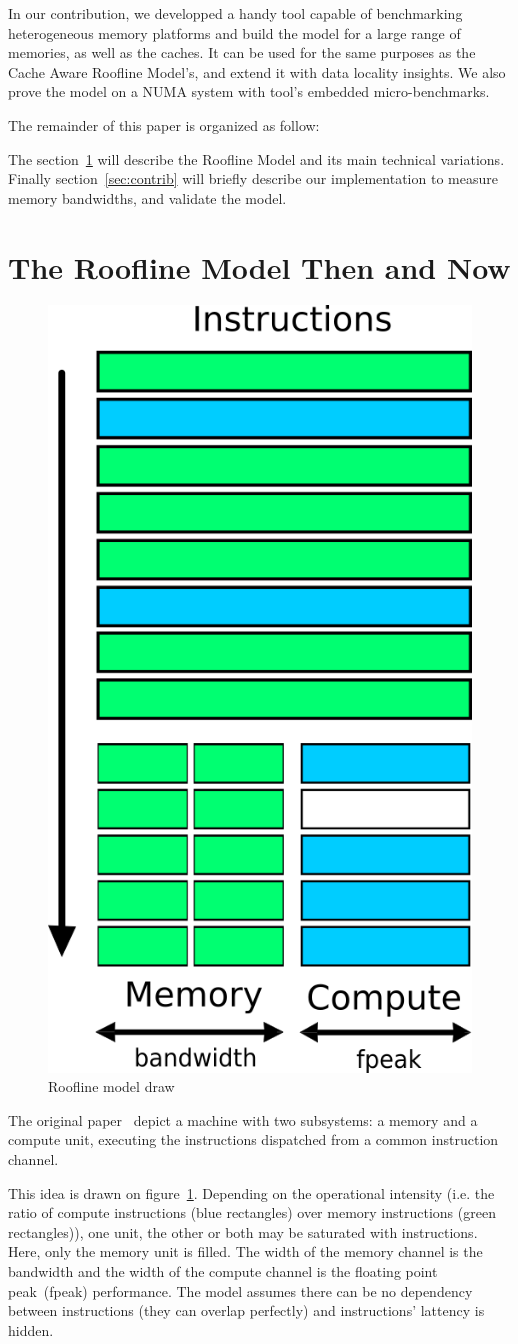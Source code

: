 \documentclass[twoside,twocolumn,8pt]{extarticle}
\begin{document}
In our contribution, we developped a handy tool capable of benchmarking heterogeneous memory platforms and build the model for a
large range of memories, as well as the caches.
It can be used for the same purposes as the Cache Aware Roofline Model's, and extend it with data locality insights.
We also prove the model on a NUMA system with tool's embedded micro-benchmarks.

The remainder of this paper is organized as follow:

The section~\ref{sec:state_of_art} will describe the Roofline Model and its main technical variations.
Finally section~\ref{sec:contrib} will briefly describe our implementation to measure memory bandwidths, and validate the model.

\section{The Roofline Model Then and Now}\label{sec:state_of_art}
\begin{figure}
  \centering
  \includegraphics[width=.2\textwidth]{pictures/model_drawing}
  \caption{Roofline model draw}
  \label{fig:roofline_draw}
\end{figure}

The original paper~\cite{Williams:2009:RIV:1498765.1498785} depict a machine with two subsystems: a memory and a compute unit,
executing the instructions dispatched from a common instruction channel.

This idea is drawn on figure~\ref{fig:roofline_draw}.
Depending on the operational intensity (i.e. the ratio of compute instructions (blue rectangles) over memory instructions (green
rectangles)), one unit, the other or both may be saturated with instructions. Here, only the memory unit is filled. 
The width of the memory channel is the bandwidth and the width of the compute channel is the floating point peak~(fpeak)
performance.
The model assumes there can be no dependency between instructions (they can overlap perfectly) and instructions' lattency is
hidden.
\end{document}
